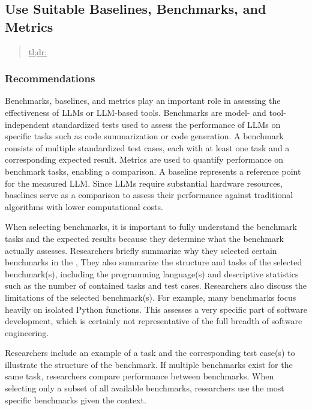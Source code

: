 



\subsection{Use Suitable Baselines, Benchmarks, and Metrics}
\label{sec:use-suitable-baselines-benchmarks-and-metrics}

\begin{quote}
\underline{tl;dr:} 
\end{quote}

\subsubsection{Recommendations}

Benchmarks, baselines, and metrics play an important role in assessing the effectiveness of LLMs or LLM-based tools.
Benchmarks are model- and tool-independent standardized tests used to assess the performance of LLMs on specific tasks such as code summarization or code generation.
A benchmark consists of multiple standardized test cases, each with at least one task and a corresponding expected result.
Metrics are used to quantify performance on benchmark tasks, enabling a comparison.
A baseline represents a reference point for the measured LLM.
Since LLMs require substantial hardware resources, baselines serve as a comparison to assess their performance against traditional algorithms with lower computational costs.

When selecting benchmarks, it is important to fully understand the benchmark tasks and the expected results because they determine what the benchmark actually assesses.
Researchers \must briefly summarize why they selected certain benchmarks in the \paper, 
They \should also summarize the structure and tasks of the selected benchmark(s), including the programming language(s) and descriptive statistics such as the number of contained tasks and test cases.
Researchers \should also discuss the limitations of the selected benchmark(s).
For example, many benchmarks focus heavily on isolated Python functions.
This assesses a very specific part of software development, which is certainly not representative of the full breadth of software engineering.

Researchers \may include an example of a task and the corresponding test case(s) to illustrate the structure of the benchmark.
If multiple benchmarks exist for the same task, researchers \should compare performance between benchmarks.
When selecting only a subset of all available benchmarks, researchers \should use the most specific benchmarks given the context.

